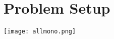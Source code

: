 \section{Problem Setup}%

\begin{figure*}[t!] %
    \centering %
    
        \texttt{[image: allmono.png]} %
    
    \caption{
}
\end{figure*}

